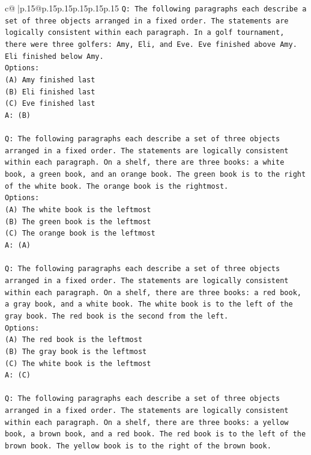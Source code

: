 \documentclass{article}
\begin{document}
{\begin{supertabular}{c@{$\;$}|p{.15\linewidth}@{}p{.15\linewidth}p{.15\linewidth}p{.15\linewidth}p{.15\linewidth}p{.15\linewidth}}
{{{\texttt{Q: The following paragraphs each describe a set of three objects arranged in a fixed order. The statements are logically consistent within each paragraph. In a golf tournament, there were three golfers: Amy, Eli, and Eve. Eve finished above Amy. Eli finished below Amy.} \\
\texttt{Options:} \\
\texttt{(A) Amy finished last} \\
\texttt{(B) Eli finished last} \\
\texttt{(C) Eve finished last} \\
\texttt{A: (B)} \\
\\ 
\texttt{Q: The following paragraphs each describe a set of three objects arranged in a fixed order. The statements are logically consistent within each paragraph. On a shelf, there are three books: a white book, a green book, and an orange book. The green book is to the right of the white book. The orange book is the rightmost.} \\
\texttt{Options:} \\
\texttt{(A) The white book is the leftmost} \\
\texttt{(B) The green book is the leftmost} \\
\texttt{(C) The orange book is the leftmost} \\
\texttt{A: (A)} \\
\\ 
\texttt{Q: The following paragraphs each describe a set of three objects arranged in a fixed order. The statements are logically consistent within each paragraph. On a shelf, there are three books: a red book, a gray book, and a white book. The white book is to the left of the gray book. The red book is the second from the left.} \\
\texttt{Options:} \\
\texttt{(A) The red book is the leftmost} \\
\texttt{(B) The gray book is the leftmost} \\
\texttt{(C) The white book is the leftmost} \\
\texttt{A: (C)} \\
\\ 
\texttt{Q: The following paragraphs each describe a set of three objects arranged in a fixed order. The statements are logically consistent within each paragraph. On a shelf, there are three books: a yellow book, a brown book, and a red book. The red book is to the left of the brown book. The yellow book is to the right of the brown book.} \\
}}}
\end{supertabular}}
\end{document}
